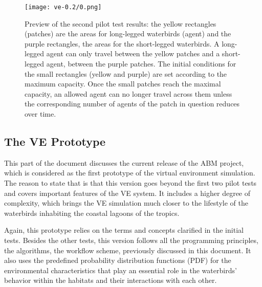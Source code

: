 \begin{figure}[h!]
    \centering
    \texttt{[image: ve-0.2/0.png]}
    \caption{Preview of the second pilot test results: the yellow rectangles (patches) are the areas for long-legged waterbirds (agent) and the purple rectangles, the areas for the short-legged waterbirds. A long-legged agent can only travel between the yellow patches and a short-legged agent, between the purple patches. The initial conditions for the small rectangles (yellow and purple) are set according to the maximum capacity. Once the small patches reach the maximal capacity, an allowed agent can no longer travel across them unless the corresponding number of agents of the patch in question reduces over time.}
    \label{fig:pilot-test-2}
\end{figure}

\subsection{The VE Prototype}
This part of the document discusses the current release of the ABM project, which is considered as the first prototype of the virtual environment simulation. The reason to state that is that this version goes beyond the first two pilot tests and covers important features of the VE system. It includes a higher degree of complexity, which brings the VE simulation much closer to the lifestyle of the waterbirds inhabiting the coastal lagoons of the tropics.

Again, this prototype relies on the terms and concepts clarified in the initial tests. Besides the other tests, this version follows all the programming principles, the algorithms, the workflow scheme, previously discussed in this document. It also uses the predefined probability distribution functions (PDF) for the environmental characteristics that play an essential role in the waterbirds' behavior within the habitats and their interactions with each other.

